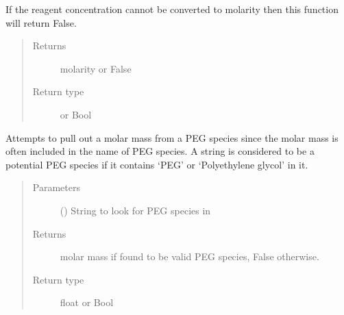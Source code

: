 \documentclass[letterpaper,10pt,english]{sphinxmanual}
\begin{document}
\begin{fulllineitems}
\begin{fulllineitems}
If the reagent concentration cannot be converted to molarity then
this function will return False.
\begin{quote}\begin{description}
\item[{Returns}] \leavevmode
molarity or False

\item[{Return type}] \leavevmode
{\hyperref[\detokenize{polo.crystallography:polo.crystallography.cocktail.UnitValue}]{}} or Bool

\end{description}\end{quote}

\end{fulllineitems}


\begin{fulllineitems}
\label{\detokenize{polo.crystallography:polo.crystallography.cocktail.Reagent.peg_parser}}
Attempts to pull out a molar mass from a PEG species since the
molar mass is often included in the name of PEG species. A string is
considered to be a potential PEG species if it contains ‘PEG’ or
‘Polyethylene glycol’ in it.
\begin{quote}\begin{description}
\item[{Parameters}] \leavevmode
{} () \textendash{} String to look for PEG species in

\item[{Returns}] \leavevmode
molar mass if found to be valid PEG species, False otherwise.

\item[{Return type}] \leavevmode
float or Bool

\end{description}\end{quote}

\end{fulllineitems}



\end{fulllineitems}
\end{document}
